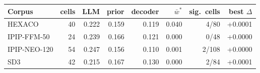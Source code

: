 \begin{tabular}{lrrrrrrr}
\toprule
Corpus & cells & LLM & prior & decoder & $\bar w^{*}$ & sig.\ cells & best $\Delta$\\
\midrule
HEXACO & 40 & 0.222 & 0.159 & 0.119 & 0.040 & 4/80 & +0.0001\\
IPIP-FFM-50 & 24 & 0.239 & 0.166 & 0.121 & 0.000 & 0/48 & +0.0000\\
IPIP-NEO-120 & 54 & 0.247 & 0.156 & 0.110 & 0.001 & 2/108 & +0.0000\\
SD3 & 42 & 0.215 & 0.167 & 0.130 & 0.000 & 2/84 & +0.0001\\
\bottomrule
\end{tabular}